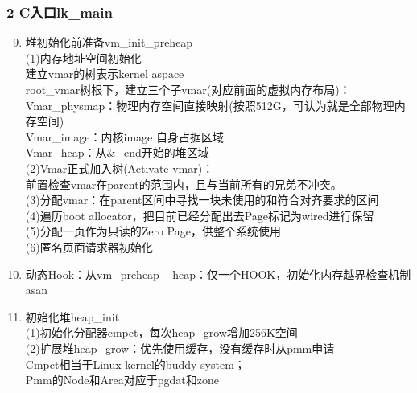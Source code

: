 \documentclass[
8pt, %
]{beamer}
\begin{document}
	\begin{frame}
		\frametitle{2 C入口lk\_main}
		\begin{enumerate}\setcounter{enumi}{8}
			\item 堆初始化前准备vm\_init\_preheap\\
			(1)内存地址空间初始化\\
			建立vmar的树表示kernel aspace\\
			root\_vmar树根下，建立三个子vmar(对应前面的虚拟内存布局)：\\
			Vmar\_physmap：物理内存空间直接映射(按照512G，可认为就是全部物理内存空间)\\
			Vmar\_image：内核image 自身占据区域\\
			Vmar\_heap：从\&\_end开始的堆区域\\
			(2)Vmar正式加入树(Activate vmar)：\\
			前置检查vmar在parent的范围内，且与当前所有的兄弟不冲突。\\
			(3)分配vmar：在parent区间中寻找一块未使用的和符合对齐要求的区间\\
			(4)遍历boot allocator，把目前已经分配出去Page标记为wired进行保留\\
			(5)分配一页作为只读的Zero Page，供整个系统使用\\
			(6)匿名页面请求器初始化
			\item 动态Hook：从vm\_preheap ~ heap：仅一个HOOK，初始化内存越界检查机制asan
			\item 初始化堆heap\_init\\
			(1)初始化分配器cmpct，每次heap\_grow增加256K空间\\
			(2)扩展堆heap\_grow：优先使用缓存，没有缓存时从pmm申请\\
			Cmpct相当于Linux kernel的buddy system；\\
            Pmm的Node和Area对应于pgdat和zone
		\end{enumerate}
	\end{frame}
\end{document}
